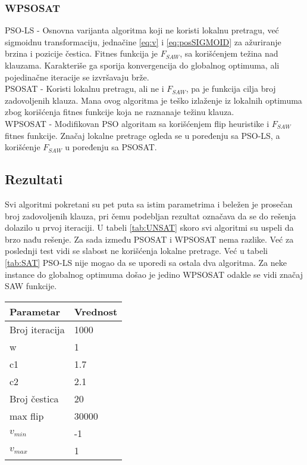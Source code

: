 \documentclass{article}
\begin{document}
\subsubsection{WPSOSAT}
\label{sec:wpsosat}


PSO-LS - Osnovna varijanta algoritma koji ne koristi lokalnu pretragu, već sigmoidnu transformaciju, jednačine \ref{eq:v} i \ref{eq:posSIGMOID} za ažuriranje brzina i pozicije čestica. Fitnes funkcija je $F_{SAW}$, sa korišćenjem težina nad klauzama. Karakteriše ga sporija konvergencija do globalnog optimuma, ali pojedinačne iteracije se izvršavaju brže.\\

PSOSAT - Koristi lokalnu pretragu, ali ne i $F_{SAW}$, pa je funkcija cilja broj zadovoljenih klauza. Mana ovog algoritma je teško izlaženje iz lokalnih optimuma zbog korišćenja fitnes funkcije koja ne raznanaje težinu klauza.\\

WPSOSAT - Modifikovan PSO algoritam sa korišćenjem flip heuristike i $F_{SAW}$ fitnes funkcije. Značaj lokalne pretrage ogleda se u poređenju sa PSO-LS, a korišćenje $F_{SAW}$ u poređenju sa PSOSAT.\\

\subsection{Rezultati}
\label{sec:pso_rezultati}

Svi algoritmi pokretani su pet puta sa istim parametrima i beležen je prosečan broj zadovoljenih klauza, pri čemu podebljan rezultat označava da se do rešenja dolazilo u prvoj iteraciji. U tabeli \ref{tab:UNSAT} skoro svi algoritmi su uspeli da brzo nađu rešenje. Za sada između PSOSAT i WPSOSAT nema razlike. Već za poslednji test vidi se slabost ne korišćenja lokalne pretrage. Već u tabeli \ref{tab:SAT} PSO-LS nije mogao da se uporedi sa ostala dva algoritma. Za neke instance do globalnog optimuma došao je jedino WPSOSAT odakle se vidi značaj SAW funkcije.

\begin{table}[h!]
\centering
{}\label{tab:parametri} 
\begin{tabular}{ |p{3cm}|p{2cm}| }
 \hline
 Parametar 	& Vrednost \\ \hline
 Broj iteracija & 1000 \\ \hline
 w & 1 \\ \hline
 c1 & 1.7 \\ \hline
 c2 & 2.1 \\  \hline
 Broj čestica	& 20 \\ \hline
 max flip & 30000 \\ \hline
 $v_{min}$ & -1 \\  \hline
 $v_{max}$ & 1\\ \hline
\end{tabular}
\end{table}
\end{document}
